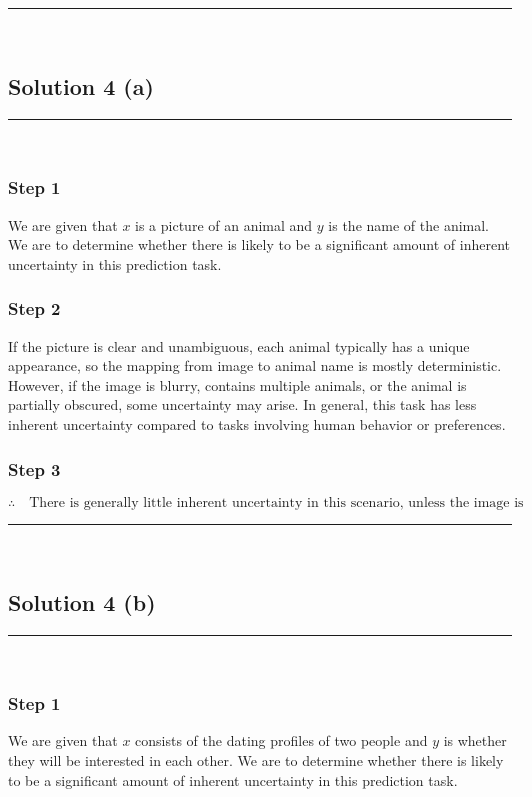 \documentclass{article}
\begin{document}
\noindent\rule{\textwidth}{0.4pt}\\

\newpage

\subsection*{Solution 4 (a)}
\noindent\rule{\textwidth}{0.4pt}\\

\subsubsection*{Step 1}
\parbox{\textwidth}{
We are given that $x$ is a picture of an animal and $y$ is the name of the animal. We are to determine whether there is likely to be a significant amount of inherent uncertainty in this prediction task.
}

\subsubsection*{Step 2}
\parbox{\textwidth}{
If the picture is clear and unambiguous, each animal typically has a unique appearance, so the mapping from image to animal name is mostly deterministic. However, if the image is blurry, contains multiple animals, or the animal is partially obscured, some uncertainty may arise. In general, this task has less inherent uncertainty compared to tasks involving human behavior or preferences.
}

\subsubsection*{Step 3}
\parbox{\textwidth}{
\[
\therefore \quad \text{There is generally little inherent uncertainty in this scenario, unless the image is ambiguous or unclear.}
\]
}

\noindent\rule{\textwidth}{0.4pt}\\

\newpage

\subsection*{Solution 4 (b)}
\noindent\rule{\textwidth}{0.4pt}\\

\subsubsection*{Step 1}
\parbox{\textwidth}{
We are given that $x$ consists of the dating profiles of two people and $y$ is whether they will be interested in each other. We are to determine whether there is likely to be a significant amount of inherent uncertainty in this prediction task.
}
\end{document}
